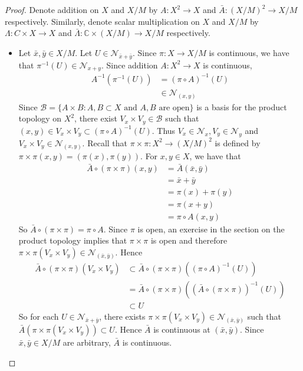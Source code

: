 \documentclass[12pt]{amsart}
\theoremstyle{definition}
\newcommand{\Lam}{\Lambda}
\newcommand{\C}{\mathbb{C}}
\newcommand{\MB}{\mathcal{B}}
\newcommand{\MN}{\mathcal{N}}
\begin{document}
	\begin{proof}
		Denote addition on $X$ and $X /M$ by $A: X^2 \rightarrow X$ and $\bar{A}:(X /M)^2 \rightarrow X/ M$ respectively. Similarly, denote scalar multiplication on $X$ and $X /M$ by $\Lam: C \times X \rightarrow X$ and $\bar{\Lam}:\C \times (X /M) \rightarrow X/ M$ respectively. 
		\begin{itemize}
			\item Let $\bar{x}, \bar{y} \in X /M$. Let $U \in \MN_{\bar{x} + \bar{y}}$. Since $\pi: X \rightarrow X / M$ is continuous, we have that $\pi^{-1}(U) \in \MN_{x+y}$. Since addition $A: X^2 \rightarrow X$ is continuous,
			\begin{align*}
				A^{-1}(\pi^{-1}(U)) 
				& = (\pi \circ A)^{-1}(U) \\
				&\in \MN_{(x,y)}
			\end{align*}
			Since $\MB = \{A \times B: A,B \subset X \text{ and $A,B$ are open}\}$ is a basis for the product topology on $X^2$, there exist $V_x \times V_y \in \MB$ such that $(x,y) \in V_x \times V_y \subset (\pi \circ A)^{-1}(U)$. Thus $V_x \in \MN_x, V_y \in \MN_y$ and $V_x \times V_y \in \MN_{(x,y)}$. Recall that $\pi \times \pi: X^2 \rightarrow (X /M)^2$ is defined by $\pi \times \pi (x,y) = (\pi(x), \pi(y))$. For $x,y \in X$, we have that 
			\begin{align*}
				\bar{A}\circ (\pi \times \pi)(x,y)
				& = \bar{A}(\bar{x}, \bar{y}) \\
				& = \bar{x} + \bar{y} \\
				&= \pi(x) + \pi(y) \\
				&= \pi (x + y) \\
				&= \pi \circ A (x,y) 
			\end{align*}
			So $\bar{A}\circ (\pi \times \pi) = \pi \circ A$.  Since $\pi$ is open, an exercise in the section on the product topology implies that $\pi \times \pi$ is open and therefore $\pi \times \pi(V_x \times V_y) \in \MN_{(\bar{x}, \bar{y})}$. Hence
			\begin{align*}
				\bar{A} \circ (\pi \times \pi) (V_x \times V_y) 
				& \subset \bar{A} \circ (\pi \times \pi)((\pi \circ A)^{-1}(U)) \\
				& = \bar{A} \circ (\pi \times \pi)((\bar{A} \circ (\pi \times \pi))^{-1}(U)) \\
				& \subset U
			\end{align*} 
			So for each $U \in \MN_{\bar{x} + \bar{y}}$, there exists $\pi \times \pi(V_x \times V_y) \in \MN_{(\bar{x}, \bar{y})}$ such that $\bar{A}(\pi \times \pi(V_x \times V_y)) \subset U$. Hence $\bar{A}$ is continuous at $(\bar{x}, \bar{y})$. Since $\bar{x}, \bar{y} \in X/ M$ are arbitrary, $\bar{A}$ is continuous. 

\end{itemize}
\end{proof}
\end{document}
